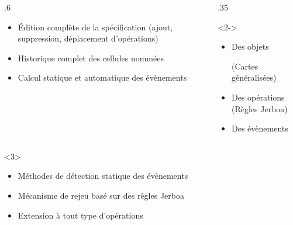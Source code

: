 \begin{frame}
	\begin{minipage}[c][.4\textheight][c]{\textwidth}
		\begin{columns}[onlytextwidth]
			\begin{column}{.6\textwidth}
				\begin{myblock}[Objectifs]
					\begin{itemize}
						\item Édition complète de la spécification (ajout,
						      suppression, déplacement d'opérations)
						\item Historique complet des cellules nommées
						\item Calcul statique et automatique des évènements
					\end{itemize}
				\end{myblock}
			\end{column}
			\begin{column}{.35\textwidth}
				\begin{onlyenv}<2->
					\begin{myblock}[Formalisation]
						\begin{itemize}
							\item Des objets \par(Cartes généralisées)
							\item Des opérations (Règles Jerboa)
							\item Des évènements
						\end{itemize}
					\end{myblock}
				\end{onlyenv}
			\end{column}
		\end{columns}
	\end{minipage}
	\begin{minipage}[c][.4\textheight][c]{\textwidth}
		\begin{minipage}{\columnwidth}
			\begin{onlyenv}<3>
				\begin{myblock}[Contributions]
					\begin{itemize}
						\item Méthodes de détection statique des évènements
						\item Mécanisme de rejeu basé sur des règles Jerboa
						\item Extension à tout type d'opérations
					\end{itemize}
				\end{myblock}
			\end{onlyenv}
		\end{minipage}
	\end{minipage}

\end{frame}




